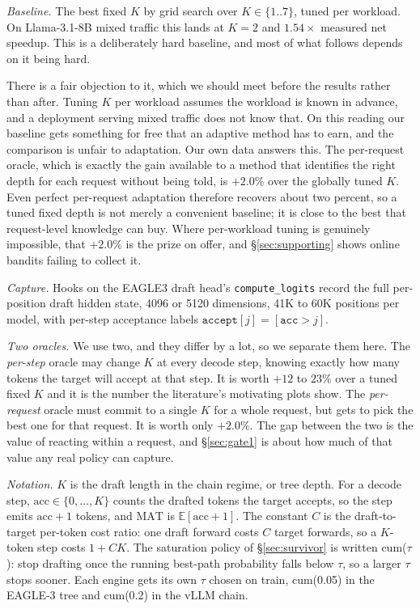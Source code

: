 \documentclass[conference]{IEEEtran}
\begin{document}
\emph{Baseline.} The best fixed $K$ by grid search over $K\in\{1..7\}$, tuned per workload.
On Llama-3.1-8B mixed traffic this lands at $K{=}2$ and $1.54\times$ measured net speedup.
This is a deliberately hard baseline, and most of what follows depends on it being hard.

There is a fair objection to it, which we should meet before the results rather than after.
Tuning $K$ per workload assumes the workload is known in advance, and a deployment serving
mixed traffic does not know that. On this reading our baseline gets something for free that an
adaptive method has to earn, and the comparison is unfair to adaptation. Our own data answers
this. The per-request oracle, which is exactly the gain available to a method that identifies
the right depth for each request without being told, is $+2.0\%$ over the globally tuned
$K$. Even perfect per-request adaptation therefore recovers about two percent, so a tuned
fixed depth is not merely a convenient baseline; it is close to the best that request-level
knowledge can buy. Where per-workload tuning is genuinely impossible, that $+2.0\%$ is the
prize on offer, and \S\ref{sec:supporting} shows online bandits failing to collect it.

\emph{Capture.} Hooks on the EAGLE3 draft head's \texttt{compute\_logits} record the full
per-position draft hidden state, 4096 or 5120 dimensions, 41K to 60K positions per model, with
per-step acceptance labels $\texttt{accept}[j] = [\texttt{acc} > j]$.

\emph{Two oracles.} We use two, and they differ by a lot, so we separate them here. The
\emph{per-step} oracle may change $K$ at every decode step, knowing exactly how many tokens
the target will accept at that step. It is worth $+12$ to $23\%$ over a tuned fixed $K$ and it
is the number the literature's motivating plots show. The \emph{per-request} oracle must
commit to a single $K$ for a whole request, but gets to pick the best one for that request. It
is worth only $+2.0\%$. The gap between the two is the value of reacting within a request,
and \S\ref{sec:gate1} is about how much of that value any real policy can capture.

\emph{Notation.} $K$ is the draft length in the chain regime, or tree depth. For a decode
step, $\mathrm{acc}\in\{0,\dots,K\}$ counts the drafted tokens the target accepts, so the step
emits $\mathrm{acc}{+}1$ tokens, and $\mathrm{MAT}$ is $\mathbb{E}[\mathrm{acc}{+}1]$. The
constant $C$ is the draft-to-target per-token cost ratio: one draft forward costs $C$ target
forwards, so a $K$-token step costs $1{+}CK$. The saturation policy of \S\ref{sec:survivor} is
written cum($\tau$): stop drafting once the running best-path probability falls below $\tau$,
so a larger $\tau$ stops sooner. Each engine gets its own $\tau$ chosen on train, cum(0.05) in
the EAGLE-3 tree and cum(0.2) in the vLLM chain.
\end{document}

